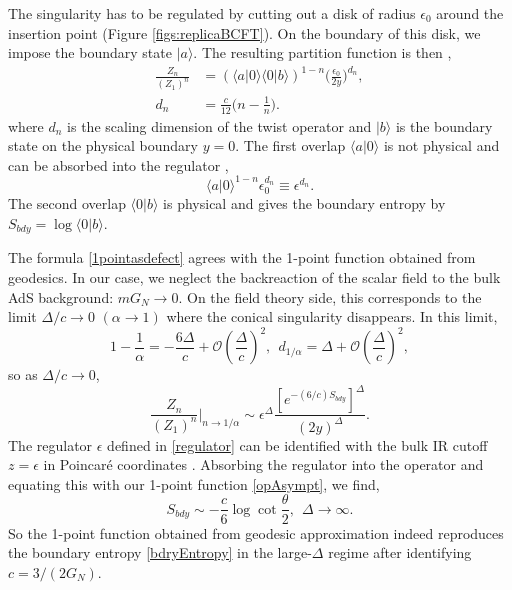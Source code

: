 \documentclass[reprint,amsmath,amssymb,aps,nofootinbib,twocolumn]{revtex4-2}
\begin{document}
The singularity has to be regulated by cutting out a disk of radius $ \epsilon_0 $ around the insertion point (Figure \ref{figs:replicaBCFT}). On the boundary of this disk, we impose the boundary state $ \lvert a\rangle $. The resulting partition function is then \cite{cardy_entanglement_2016,sully_bcft_2020},
\begin{equation}
\begin{split}
\frac{Z_n}{(Z_1)^{n}} &= (\langle a\lvert 0 \rangle \langle 0 \lvert b \rangle)^{1-n}\biggl(\frac{\epsilon_0}{2y}\biggr)^{d_n},\\
d_n &= \frac{c}{12}\biggl(n-\frac{1}{n}\biggr).
\end{split}
\end{equation}
where $ d_n $ is the scaling dimension of the twist operator and $ \lvert b \rangle $ is the boundary state on the physical boundary $ y=0 $. The first overlap $ \langle a\lvert 0 \rangle $ is not physical and can be absorbed into the regulator \cite{sully_bcft_2020},
\begin{equation}
\langle a\lvert 0 \rangle^{1-n}\epsilon_0^{d_n} \equiv \epsilon^{d_n}.
\label{regulator}
\end{equation}
The second overlap $ \langle 0 \lvert b \rangle $ is physical and gives the boundary entropy by $ S_{bdy} = \log{\langle 0 \lvert b \rangle} $.

The formula \eqref{1pointasdefect} agrees with the 1-point function obtained from geodesics. In our case, we neglect the backreaction of the scalar field to the bulk AdS background: $mG_{N} \rightarrow 0$. On the field theory side, this corresponds to the limit $ \Delta\slash c\rightarrow 0 $ $ (\alpha \rightarrow 1) $ where the conical singularity disappears. In this limit,
\begin{equation}
1-\frac{1}{\alpha} = - \frac{6\Delta}{c} + \mathcal{O}\left(\frac{\Delta}{c}\right)^2,\ \ d_{1\slash \alpha} = \Delta + \mathcal{O}\left(\frac{\Delta}{c}\right)^2,
\end{equation}
so as $\Delta/c \to 0$,
\begin{equation}
\frac{Z_n}{(Z_1)^{n}}\bigg\lvert_{n\rightarrow 1\slash \alpha} \sim \epsilon^{\Delta}\frac{\left[e^{-(6\slash c)S_{bdy}}\right]^{\Delta}}{(2y)^{\Delta}}.
\end{equation}
The regulator $ \epsilon $ defined in \eqref{regulator} can be identified with the bulk IR cutoff $ z = \epsilon $ in Poincar\'e coordinates \cite{sully_bcft_2020}. Absorbing the regulator into the operator and equating this with our 1-point function \eqref{opAsympt}, we find,
\begin{equation}
S_{bdy} \sim -\frac{c}{6}\log{\cot{\frac{\theta}{2}}},\ \ \Delta \to \infty.\label{bdryEntropyCheck}
\end{equation}
So the 1-point function obtained from geodesic approximation indeed reproduces the boundary entropy \eqref{bdryEntropy} in the large-$\Delta$ regime after identifying $c = 3/(2G_N)$.
\end{document}
